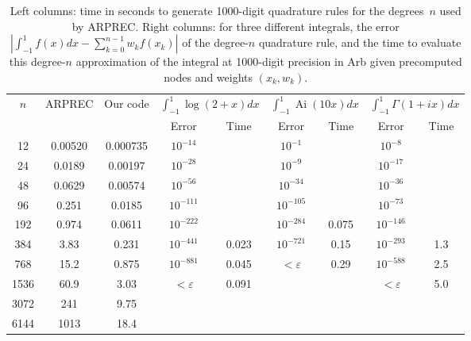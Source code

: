 \documentclass{siamart0216}
\begin{document}
\begin{table}[h!]
\begin{centering}
\begin{tabular}{ c | c c | c c| c c | c c }
$n$ & ARPREC & Our code &
    \multicolumn{2}{|c|}{$\int_{-1}^{1}\!\log(2\!+\!x) dx$} &
    \multicolumn{2}{|c|}{$\int_{-1}^{1}\!\operatorname{Ai}(10 x) dx$} &
    \multicolumn{2}{|c}{$\int_{-1}^{1}\!\Gamma(1\!+\!ix) dx$} \\
   &         &          & Error   & Time      &  Error & Time  &  Error & Time \\ \hline
\rule{0pt}{3ex}12 & 0.00520 & 0.000735 & $10^{-14}$ &       &   $10^{-1}$ &  &  $10^{-8}$ & \\
24 & 0.0189 & 0.00197 & $10^{-28}$  &       &  $10^{-9}$  & &  $10^{-17}$ & \\
48 & 0.0629 & 0.00574 & $10^{-56}$ &        &  $10^{-34}$  &    &  $10^{-36}$ & \\
96 & 0.251 & 0.0185 & $10^{-111}$  &         &  $10^{-105}$ &          &  $10^{-73}$ & \\
192 & 0.974 & 0.0611 & $10^{-222}$ &         &  $10^{-284}$ &    0.075      &   $10^{-146}$ & \\
384 & 3.83 & 0.231 & $10^{-441}$  &  0.023        & $10^{-721}$ & 0.15           &   $10^{-293}$ & 1.3 \\
768 & 15.2 & 0.875 & $10^{-881}$ & 0.045      & $<\varepsilon$ & 0.29           &   $10^{-588}$ & 2.5 \\
1536 & 60.9 & 3.03 & $<\varepsilon$ &  0.091     &                &    &            $<\varepsilon$ & 5.0 \\
3072 & 241 & 9.75 &  &  &  &  &  &  \\
6144 & 1013 & 18.4 &  &  &  &  &  &  \\
\end{tabular}
\caption{Left columns: time in seconds to generate 1000-digit
quadrature rules for the degrees~$n$ used by ARPREC.
Right columns: for three different integrals, the
error $|\int_{-1}^1 f(x) dx - \sum_{k=0}^{n-1} w_k f(x_k)|$ of the degree-$n$
quadrature rule, and the time to evaluate this degree-$n$ approximation
of the integral at 1000-digit precision in Arb given precomputed nodes and weights $(x_k, w_k)$.}
\label{tab:arprectimings}
\end{centering}
\end{table}
\end{document}
